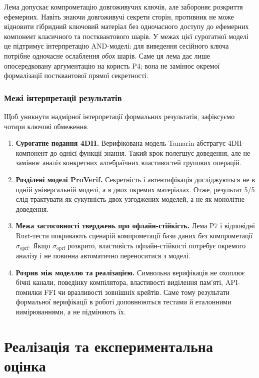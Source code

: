 \documentclass{llncs}
\newcommand{\sigoprf}{\sigma_{\mathrm{oprf}}}
\begin{document}
Лема допускає компрометацію довгоживучих ключів, але забороняє розкриття
ефемерних. Навіть знаючи довгоживучі секрети сторін, противник не може
відновити гібридний ключовий матеріал без одночасного доступу до
ефемерних компонент класичного та постквантового шарів. У межах цієї
сурогатної моделі це
підтримує інтерпретацію AND-моделі: для виведення сесійного ключа
потрібне одночасне ослаблення \emph{обох} шарів. Саме ця лема дає
лише опосередковану аргументацію на користь P4; вона не замінює окремої
формалізації постквантової прямої секретності.

\subsubsection{Межі інтерпретації результатів}

Щоб уникнути надмірної інтерпретації формальних результатів, зафіксуємо
чотири ключові обмеження.
\begin{enumerate}
  \item \textbf{Сурогатне подання 4DH.} Верифікована модель Tamarin абстрагує
        4DH-компонент до однієї функції знання. Такий крок полегшує
        доведення, але не замінює аналіз конкретних алгебраїчних властивостей
        групових операцій.
  \item \textbf{Розділені моделі ProVerif.} Секретність і автентифікація
        досліджуються не в одній універсальній моделі, а в двох
        окремих матеріалах. Отже, результат 5/5 слід трактувати як
        сукупність двох узгоджених моделей, а не як монолітне доведення.
  \item \textbf{Межа застосовності тверджень про офлайн-стійкість.} Лема P7 і
        відповідні Rust-тести покривають сценарій компрометації бази
        даних \emph{без} компрометації $\sigoprf$. Якщо
        $\sigoprf$ розкрито, властивість офлайн-стійкості
        потребує окремого аналізу і не повинна автоматично переноситися
        з моделі.
  \item \textbf{Розрив між моделлю та реалізацією.} Символьна верифікація не охоплює
        бічні канали, поведінку компілятора, властивості виділення
        пам'яті, API-помилки FFI чи вразливості зовнішніх крейтів. Саме
        тому результати формальної верифікації в роботі доповнюються
        тестами й еталонними вимірюваннями, а не підміняють їх.
\end{enumerate}

\section{Реалізація та експериментальна оцінка}
\end{document}
